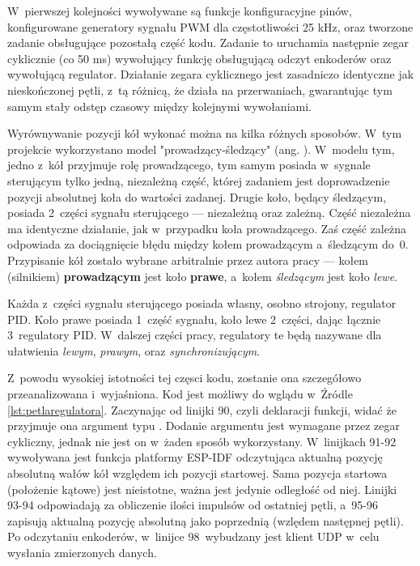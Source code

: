 W~pierwszej kolejności wywoływane są funkcje konfiguracyjne pinów, konfigurowane generatory sygnału PWM dla częstotliwości 25 kHz, oraz tworzone zadanie obsługujące pozostałą część kodu. Zadanie to uruchamia następnie zegar cyklicznie (co 50 ms) wywołujący funkcję obsługującą odczyt enkoderów oraz wywołującą regulator. Działanie zegara cyklicznego jest zasadniczo identyczne jak nieskończonej pętli, z~tą różnicą, że działa na przerwaniach, gwarantując tym samym stały odstęp czasowy między kolejnymi wywołaniami.

Wyrównywanie pozycji kół wykonać można na kilka różnych sposobów. W~tym projekcie wykorzystano model "prowadzący-śledzący" (ang. ). W~modelu tym, jedno z~kół przyjmuje rolę prowadzącego, tym samym posiada w~sygnale sterującym tylko jedną, niezależną część, której zadaniem jest doprowadzenie pozycji absolutnej koła do wartości zadanej. Drugie koło, będący śledzącym, posiada 2~części sygnału sterującego --- niezależną oraz zależną. Część niezależna ma identyczne działanie, jak w~przypadku koła prowadzącego. Zaś część zależna odpowiada za dociągnięcie błędu między kołem prowadzącym a~śledzącym do~0. Przypisanie kół zostało wybrane arbitralnie przez autora pracy --- kołem (silnikiem) \textbf{prowadzącym} jest koło \textbf{prawe}, a~kołem \textit{śledzącym} jest koło \textit{lewe}.

Każda z~części sygnału sterującego posiada własny, osobno strojony, regulator PID. Koło prawe posiada 1~część sygnału, koło lewe 2~części, dając łącznie 3~regulatory PID. W~dalszej części pracy, regulatory te będą nazywane dla ułatwienia \textit{lewym}, \textit{prawym}, oraz \textit{synchronizującym}.

Z~powodu wysokiej istotności tej częsci kodu, zostanie ona szczegółowo przeanalizowana i~wyjaśniona. Kod jest możliwy do wglądu w~Źródle \ref{lst:petlaregulatora}. Zaczynając od linijki 90, czyli deklaracji funkcji, widać że przyjmuje ona argument typu . Dodanie argumentu jest wymagane przez zegar cykliczny, jednak nie jest on w~żaden sposób wykorzystany. W~linijkach 91-92 wywoływana jest funkcja platformy ESP-IDF odczytująca aktualną pozycję absolutną wałów kół względem ich pozycji startowej. Sama pozycja startowa (położenie kątowe) jest nieistotne, ważna jest jedynie odległość od niej. Linijki 93-94 odpowiadają za obliczenie ilości impulsów od ostatniej pętli, a~95-96 zapisują aktualną pozycję absolutną jako poprzednią (wzlędem następnej pętli). Po odczytaniu enkoderów, w~linijce 98~wybudzany jest klient UDP w~celu wysłania zmierzonych danych.

